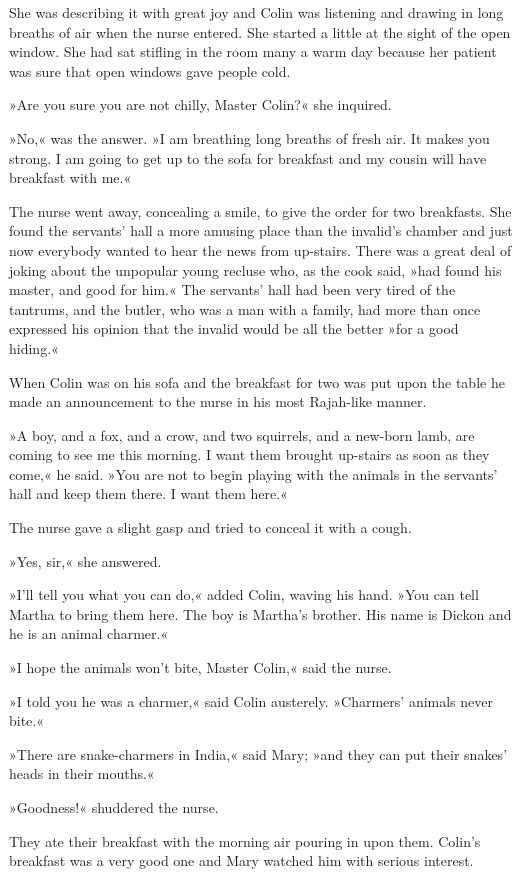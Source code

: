 She was describing it with great joy and Colin was listening and drawing in long breaths of air when the nurse entered. She started a little at the sight of the open window. She had sat stifling in the room many a warm day because her patient was sure that open windows gave people cold.

»Are you sure you are not chilly, Master Colin?« she inquired.

»No,« was the answer. »I am breathing long breaths of fresh air. It makes you strong. I am going to get up to the sofa for breakfast and my cousin will have breakfast with me.«

The nurse went away, concealing a smile, to give the order for two breakfasts. She found the servants' hall a more amusing place than the invalid's chamber and just now everybody wanted to hear the news from up-stairs. There was a great deal of joking about the unpopular young recluse who, as the cook said, »had found his master, and good for him.« The servants' hall had been very tired of the tantrums, and the butler, who was a man with a family, had more than once expressed his opinion that the invalid would be all the better »for a good hiding.«

When Colin was on his sofa and the breakfast for two was put upon the table he made an announcement to the nurse in his most Rajah-like manner.

»A boy, and a fox, and a crow, and two squirrels, and a new-born lamb, are coming to see me this morning. I want them brought up-stairs as soon as they come,« he said. »You are not to begin playing with the animals in the servants' hall and keep them there. I want them here.«

The nurse gave a slight gasp and tried to conceal it with a cough.

»Yes, sir,« she answered.

»I'll tell you what you can do,« added Colin, waving his hand. »You can tell Martha to bring them here. The boy is Martha's brother. His name is Dickon and he is an animal charmer.«

»I hope the animals won't bite, Master Colin,« said the nurse.

»I told you he was a charmer,« said Colin austerely. »Charmers' animals never bite.«

»There are snake-charmers in India,« said Mary; »and they can put their snakes' heads in their mouths.«

»Goodness!« shuddered the nurse.

They ate their breakfast with the morning air pouring in upon them. Colin's breakfast was a very good one and Mary watched him with serious interest.

